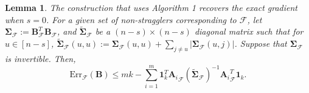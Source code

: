 \documentclass[journal,draftcls,onecolumn]{IEEEtran}
\theoremstyle{mystyle}
\newtheorem{lemma}{Lemma}
\begin{document}
\begin{lemma}
\label{lemma:second_cons}
The construction that uses Algorithm 1 recovers the exact gradient when $s = 0$. For a given set of non-stragglers corresponding to $\mathcal{F}$, let $\mathbf{\Sigma}_{\mathcal{F}} := \mathbf{B}_{\mathcal{F}}^T\mathbf{B}_{\mathcal{F}}$, and $\tilde{\mathbf{\Sigma}}_{\mathcal{F}}$ be a $(n-s) \times (n-s)$ diagonal matrix such that for $u \in [n-s]$, 
 $\tilde{\mathbf{\Sigma}}_{\mathcal{F}}(u,u) := \mathbf{\Sigma}_{\mathcal{F}}(u,u) + \sum_{j \ne u} |\mathbf{\Sigma}_{\mathcal{F}}(u,j)|$. Suppose that $\mathbf{\Sigma}_{\mathcal{F}}$ is invertible. Then,
\begin{equation}\label{eq:bounddiagdom}
\text{Err}_{\mathcal{F}}(\mathbf{B}) \le mk - \sum_{i = 1}^m \mathbf{1}_k^T {\mathbf{A}_i}_{\mathcal{F}} (\tilde{\mathbf{\Sigma}}_{\mathcal{F}})^{-1} {\mathbf{A}_i}_{\mathcal{F}}^T \mathbf{1}_k.  
\end{equation}
\end{lemma}
\end{document}
